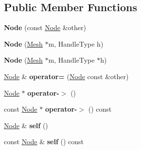 \subsection*{Public Member Functions}
\begin{DoxyCompactItemize}
\item 
\hypertarget{classINMOST_1_1Node_a3fc491ada3dc479780d467ee6cdb80ab}{{\bfseries Node} (const \hyperlink{classINMOST_1_1Node}{Node} \&other)}\label{classINMOST_1_1Node_a3fc491ada3dc479780d467ee6cdb80ab}

\item 
\hypertarget{classINMOST_1_1Node_ac5ddbc31a3ec69a4bb950f62b72e880b}{{\bfseries Node} (\hyperlink{classINMOST_1_1Mesh}{Mesh} $\ast$m, Handle\-Type h)}\label{classINMOST_1_1Node_ac5ddbc31a3ec69a4bb950f62b72e880b}

\item 
\hypertarget{classINMOST_1_1Node_a9c2c4cafdf456a58d02dc58b914ae294}{{\bfseries Node} (\hyperlink{classINMOST_1_1Mesh}{Mesh} $\ast$m, Handle\-Type $\ast$h)}\label{classINMOST_1_1Node_a9c2c4cafdf456a58d02dc58b914ae294}

\item 
\hypertarget{classINMOST_1_1Node_a66f15cc56dd523d7e445bf2daa4619c3}{\hyperlink{classINMOST_1_1Node}{Node} \& {\bfseries operator=} (\hyperlink{classINMOST_1_1Node}{Node} const \&other)}\label{classINMOST_1_1Node_a66f15cc56dd523d7e445bf2daa4619c3}

\item 
\hypertarget{classINMOST_1_1Node_a8a795b182d86d10bf78589a200d38e93}{\hyperlink{classINMOST_1_1Node}{Node} $\ast$ {\bfseries operator-\/$>$} ()}\label{classINMOST_1_1Node_a8a795b182d86d10bf78589a200d38e93}

\item 
\hypertarget{classINMOST_1_1Node_aabde896f896f372a6c6c0076716bb599}{const \hyperlink{classINMOST_1_1Node}{Node} $\ast$ {\bfseries operator-\/$>$} () const }\label{classINMOST_1_1Node_aabde896f896f372a6c6c0076716bb599}

\item 
\hypertarget{classINMOST_1_1Node_aecea484b041833ddff1635e4823cd0f2}{\hyperlink{classINMOST_1_1Node}{Node} \& {\bfseries self} ()}\label{classINMOST_1_1Node_aecea484b041833ddff1635e4823cd0f2}

\item 
\hypertarget{classINMOST_1_1Node_ab61e3edc72e68dd7c05a76ae0a9b8b6e}{const \hyperlink{classINMOST_1_1Node}{Node} \& {\bfseries self} () const }\label{classINMOST_1_1Node_ab61e3edc72e68dd7c05a76ae0a9b8b6e}


\end{DoxyCompactItemize}
